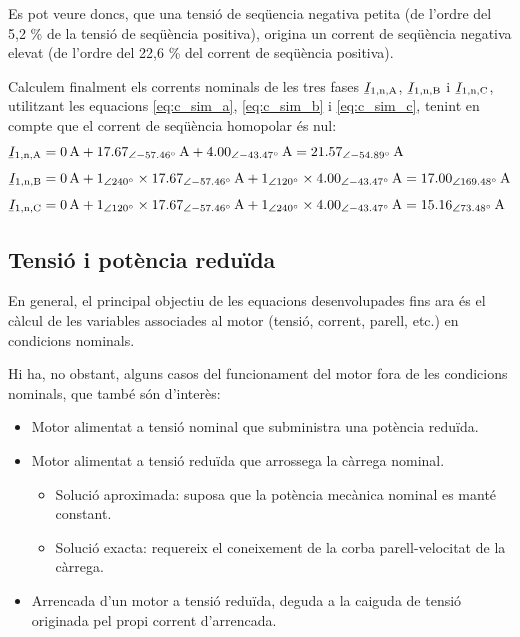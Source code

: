 \begin{exemple}
	Es pot veure doncs, que una tensió de seqüencia negativa petita (de l'ordre del 5,2 \% de la tensió de seqüència positiva), origina un corrent de seqüència negativa elevat (de l'ordre del 22,6 \% del corrent de seqüència positiva). 
	
	Calculem finalment els corrents nominals de les tres fases $\cmplx{I}\ped{1,n,A}$, $\cmplx{I}\ped{1,n,B}$ i $\cmplx{I}\ped{1,n,C}$, utilitzant les equacions \eqref{eq:c_sim_a},
	\eqref{eq:c_sim_b} i \eqref{eq:c_sim_c}, tenint en compte que el corrent de seqüència homopolar és nul:
	\begin{align*}
		\cmplx{I}\ped{1,n,A} &= \SI{0}{A} + \SIpd{17,67}{-57,46}{A} +
		\SIpd{4,00}{-43,47}{A}  =
		\SIpd{21,57}{-54,89}{A} \\[1ex]
		\cmplx{I}\ped{1,n,B} &= \SI{0}{A} + \numpd{1}{240} \times
		\SIpd{17,67}{-57,46}{A} + \numpd{1}{120} \times
		\SIpd{4,00}{-43,47}{A}  =
		\SIpd{17,00}{169,48}{A}    \\[1ex]
		\cmplx{I}\ped{1,n,C} &= \SI{0}{A} + \numpd{1}{120} \times
		\SIpd{17,67}{-57,46}{A} +
		\numpd{1}{240} \times \SIpd{4,00}{-43,47}{A}  =
		\SIpd{15,16}{73,48}{A}
\end{align*}
	
\end{exemple}
	

\subsection{Tensió i potència reduïda}\label{sec:mot-tens-pot-red}

En general, el principal objectiu de les equacions desenvolupades fins ara és el càlcul de les variables associades al motor (tensió, corrent, parell, etc.) en condicions nominals.

Hi ha, no obstant, alguns casos del funcionament del motor fora de les condicions nominals, que també són d'interès: 
\begin{itemize}
	\item  Motor alimentat a tensió nominal que subministra una potència reduïda.
	\item  Motor alimentat a tensió reduïda que arrossega la càrrega nominal.
	\begin{itemize}
		\item Solució aproximada: suposa que la potència mecànica nominal es manté constant.
		\item Solució exacta: requereix el coneixement de la corba parell-velocitat de la càrrega.
	\end{itemize}	
	\item Arrencada d'un motor a tensió reduïda, deguda a la caiguda de tensió originada pel propi corrent d'arrencada.
\end{itemize}

